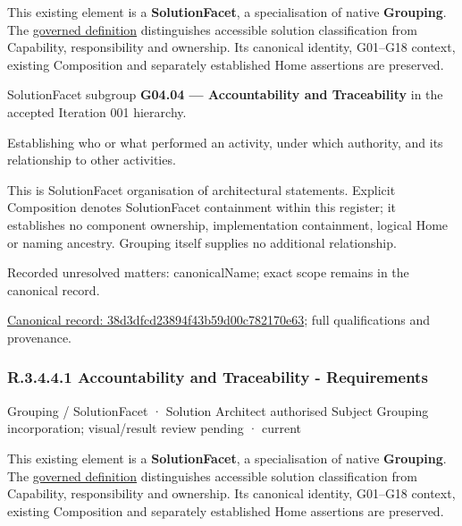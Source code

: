 This existing element is a \textbf{SolutionFacet}, a specialisation of native
\textbf{Grouping}. The \href{\detokenize{../../../../../../../governance/continuum-representation.md#solutionfacet-classification--1119-candidate}}{governed definition}
distinguishes accessible solution classification from Capability, responsibility
and ownership. Its canonical identity, G01–G18 context, existing Composition
and separately established Home assertions are preserved.



SolutionFacet subgroup \textbf{G04.04 — Accountability and Traceability} in the accepted Iteration 001 hierarchy.



Establishing who or what performed an activity, under which authority, and its relationship to other activities.



This is SolutionFacet organisation of architectural statements. Explicit Composition denotes SolutionFacet containment within this register; it establishes no component ownership, implementation containment, logical Home or naming ancestry. Grouping itself supplies no additional relationship.


{\small Recorded unresolved matters: canonicalName; exact scope remains in the canonical record.}\par
{\footnotesize \href{../../../../../../../continuum/grouping/38d3dfcd23894f43b59d00c782170e63.md}{Canonical record: 38d3dfcd23894f43b59d00c782170e63}; full qualifications and provenance.}\par
\subsubsection*{R.3.4.4.1 Accountability and Traceability - Requirements}
\label{navigation:R.3.4.4.1}

\label{element:b12837a817d14919b5c33b35e3bb3d5a}
{\small Grouping / SolutionFacet · Solution Architect authorised Subject Grouping incorporation; visual/result review pending · current}\par

This existing element is a \textbf{SolutionFacet}, a specialisation of native
\textbf{Grouping}. The \href{\detokenize{../../../../../../../governance/continuum-representation.md#solutionfacet-classification--1119-candidate}}{governed definition}
distinguishes accessible solution classification from Capability, responsibility
and ownership. Its canonical identity, G01–G18 context, existing Composition
and separately established Home assertions are preserved.



